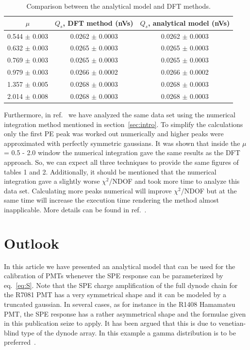 \documentclass[preprint,12pt]{elsarticle}
\begin{document}
\begin{table}[t!]
\centering
\begin{tabular}{| c  || c | c |}
\hline
$\mu$                      & $Q_s$, DFT method (nVs)  	       & $Q_s$, analytical model (nVs)           \\[0.6ex] \hline\hline
0.544 $\pm$ 0.003  & 0.0262 	$\pm$ 0.0003			       	       & 0.0262 	$\pm$ 0.0003					     				\\
0.632 $\pm$ 0.003  & 0.0265	$\pm$ 0.0003				       & 0.0265	$\pm$ 0.0003				  	    				\\
0.769 $\pm$ 0.003  & 0.0265	$\pm$ 0.0003				       & 0.0265	$\pm$ 0.0003					  	    				\\
0.979 $\pm$ 0.003  & 0.0266	$\pm$ 0.0002				       & 0.0266	$\pm$ 0.0002				    	    				\\
1.357 $\pm$ 0.005  & 0.0268	$\pm$ 0.0003				       & 0.0268    $\pm$ 0.0003						  	    				\\
2.014 $\pm$ 0.008  & 0.0268	$\pm$ 0.0003				       & 0.0268	$\pm$ 0.0003				  			
\\[0.6ex] \hline\hline
\end{tabular}
\caption{Comparison between the analytical model and DFT methods.}
\label{tab:comp}
\end{table}

Furthermore, in ref.~\cite{me2} we have analyzed the same data set using the numerical integration method mentioned in section~\ref{sec:intro}.  
To simplify the calculations only the first PE peak was worked out numerically and higher peaks were approximated with perfectly symmetric gaussians. 
It was shown that inside the $\mu$ = 0.5 - 2.0 window the numerical integration gave the same results as the DFT approach. 
So, we can expect all three techniques to provide the same figures of tables 1 and 2. 
Additionally, it should be mentioned that the numerical integration gave a slightly worse $\chi^2$/NDOF and took more time to analyze this data set. 
Calculating more peaks numerical will improve $\chi^2$/NDOF but at the same time will increase the execution time rendering the method almost inapplicable. 
More details can be found in ref.~\cite{me2}. 


\section{Outlook}
\label{sec:outro}
%
In this article we have presented an analytical model that can be used for the calibration of PMTs whenever the SPE response can be parameterized by eq.~\eqref{eq:S}.  
Note that the SPE charge amplification of the full dynode chain for the R7081 PMT has a very symmetrical shape and it can be modeled by a truncated gaussian.  
In several cases, as for instance in the R1408 Hamamatsu PMT, the SPE response has a rather asymmetrical shape and the formulae given in this publication seize  to apply.  %
It has been argued that this is due to venetian-blind type of the dynode array.   %
In this example a gamma distribution is to be preferred~\cite{me}. 
\end{document}
